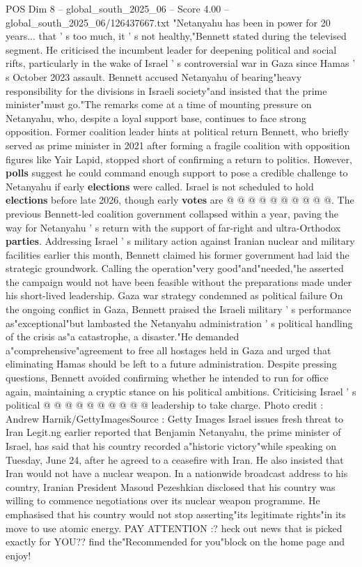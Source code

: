 \begin{textsample}{POS Dim 8 – global\_south\_2025\_06 – Score 4.00 – global\_south\_2025\_06/126437667.txt}  \label{ex:f8_pos_423}
"Netanyahu has been in power for 20 years... that ' s too much, it ' s not healthy,"Bennett stated during the televised segment.
He criticised the incumbent leader for deepening political and social rifts, particularly in the wake of Israel ' s controversial war in Gaza since Hamas ' s October 2023 assault.
Bennett accused Netanyahu of bearing"heavy responsibility for the divisions in Israeli society"and insisted that the prime minister"must go."The remarks come at a time of mounting pressure on Netanyahu, who, despite a loyal support base, continues to face strong opposition.
Former coalition leader hints at political return Bennett, who briefly served as prime minister in 2021 after forming a fragile coalition with opposition figures like Yair Lapid, stopped short of confirming a return to politics.
However, \textbf{polls} suggest he could command enough support to pose a credible challenge to Netanyahu if early \textbf{elections} were called.
Israel is not scheduled to hold \textbf{elections} before late 2026, though early \textbf{votes} are @ @ @ @ @ @ @ @ @ @.
The previous Bennett-led coalition government collapsed within a year, paving the way for Netanyahu ' s return with the support of far-right and ultra-Orthodox \textbf{parties}.
Addressing Israel ' s military action against Iranian nuclear and military facilities earlier this month, Bennett claimed his former government had laid the strategic groundwork.
Calling the operation"very good"and"needed,"he asserted the campaign would not have been feasible without the preparations made under his short-lived leadership.
Gaza war strategy condemned as political failure On the ongoing conflict in Gaza, Bennett praised the Israeli military ' s performance as"exceptional"but lambasted the Netanyahu administration ' s political handling of the crisis as"a catastrophe, a disaster."He demanded a"comprehensive"agreement to free all hostages held in Gaza and urged that eliminating Hamas should be left to a future administration.
Despite pressing questions, Bennett avoided confirming whether he intended to run for office again, maintaining a cryptic stance on his political ambitions.
Criticising Israel ' s political @ @ @ @ @ @ @ @ @ @ leadership to take charge.
Photo credit : Andrew Harnik/GettyImagesSource : Getty Images Israel issues fresh threat to Iran Legit.ng earlier reported that Benjamin Netanyahu, the prime minister of Israel, has said that his country recorded a"historic victory"while speaking on Tuesday, June 24, after he agreed to a ceasefire with Iran.
He also insisted that Iran would not have a nuclear weapon.
In a nationwide broadcast address to his country, Iranian President Masoud Pezeshkian disclosed that his country was willing to commence negotiations over its nuclear weapon programme.
He emphasised that his country would not stop asserting"its legitimate rights"in its move to use atomic energy.
PAY ATTENTION :? heck out news that is picked exactly for YOU?? find the"Recommended for you"block on the home page and enjoy!

\end{textsample}
